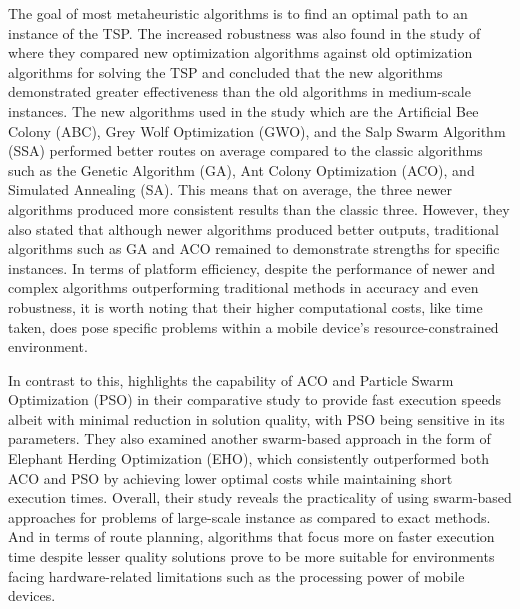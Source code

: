 The goal of most metaheuristic algorithms is to find an optimal path to an instance of the TSP. The increased robustness was also found in the study of \textcite{Hossain2024} where they compared new optimization algorithms against old optimization algorithms for solving the TSP and concluded that the new algorithms demonstrated greater effectiveness than the old algorithms in medium-scale instances. The new algorithms used in the study which are the Artificial Bee Colony (ABC), Grey Wolf Optimization (GWO), and the Salp Swarm Algorithm (SSA) performed better routes on average compared to the classic algorithms such as the Genetic Algorithm (GA), Ant Colony Optimization (ACO), and Simulated Annealing (SA). This means that on average, the three newer algorithms produced more consistent results than the classic three. However, they also stated that although newer algorithms produced better outputs, traditional algorithms such as GA and ACO remained to demonstrate strengths for specific instances. In terms of platform efficiency, despite the performance of newer and complex algorithms outperforming traditional methods in accuracy and even robustness, it is worth noting that their higher computational costs, like time taken, does pose specific problems within a mobile device’s resource-constrained environment.

In contrast to this, \textcite{Wadi2025} highlights the capability of ACO and Particle Swarm Optimization (PSO) in their comparative study to provide fast execution speeds albeit with minimal reduction in solution quality, with PSO being sensitive in its parameters. They also examined another swarm-based approach in the form of Elephant Herding Optimization (EHO), which consistently outperformed both ACO and PSO by achieving lower optimal costs while maintaining short execution times. Overall, their study reveals the practicality of using swarm-based approaches for problems of large-scale instance as compared to exact methods. And in terms of route planning, algorithms that focus more on faster execution time despite lesser quality solutions prove to be more suitable for environments facing hardware-related limitations such as the processing power of mobile devices.


